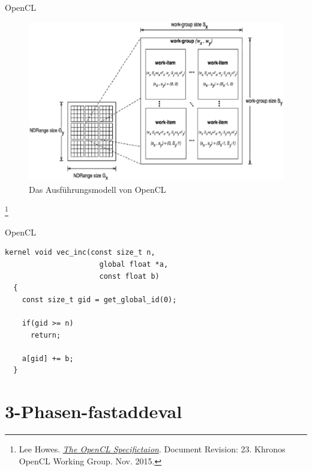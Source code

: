 \documentclass[10pt]{beamer}
\let\svthefootnote\thefootnote
\begin{document}
\begin{frame}{OpenCL}
  \begin{figure}
    \centering
    \includegraphics[width=.75\linewidth]{figures/fg-opencl-execution-model.pdf}
    \caption{Das Ausführungsmodell von OpenCL}
  \end{figure}

  \footnotesize
  \let\thefootnote\relax\footnote{Lee Howes. \href{https://www.khronos.org/registry/OpenCL/specs/opencl-2.0.pdf}{\textit{The OpenCL Specifictaion}}. Document Revision: 23. Khronos OpenCL Working Group. Nov. 2015.}
  \addtocounter{footnote}{-1}\let\thefootnote\svthefootnote\relax
  \normalsize
\end{frame}

\begin{frame}[fragile]{OpenCL}
  \begin{lstlisting}[style=CStyle]
  kernel void vec_inc(const size_t n,
                      global float *a,
                      const float b)
  {
    const size_t gid = get_global_id(0);

    if(gid >= n)
      return;

    a[gid] += b;
  }
  \end{lstlisting}
\end{frame}
\section{3-Phasen-fastaddeval}
\end{document}
